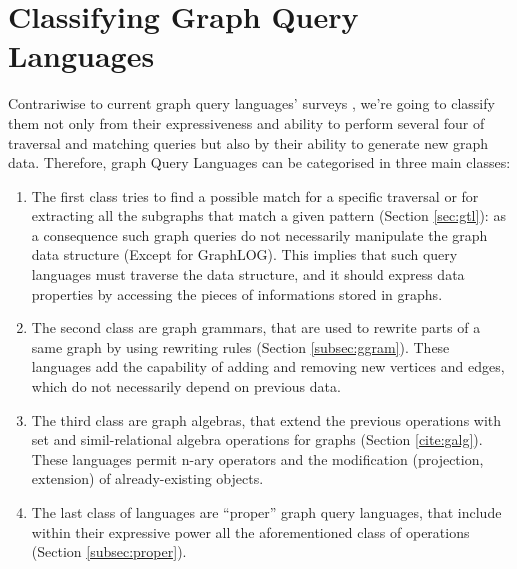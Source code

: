 \section{Classifying Graph Query Languages}\label{sec:dbqlang}

%

Contrariwise to current graph query languages' surveys \cite{AnglesABHRV17}, we're going to classify them not only from their expressiveness and ability to perform several four of traversal and matching queries but also by their ability to generate new graph data. Therefore, graph Query Languages can be categorised in three main classes:
\begin{enumerate}
	\item The first class  tries to find a
	possible match for a specific traversal  or for extracting all the subgraphs that match a given pattern (Section \vref{sec:gtl}): as a consequence such graph
	queries do not necessarily manipulate the graph data structure (Except for GraphLOG). This implies that such query languages must traverse the data structure, and it should express data properties by accessing the pieces of informations stored in graphs.
	\item The second class are graph grammars, that are used to rewrite parts of a same graph by using rewriting rules (Section \vref{subsec:ggram}). These languages add the capability of adding and removing new vertices and edges, which do not necessarily depend on previous data.
	\item The third class are graph algebras, that extend the previous operations with set and simil-relational algebra operations for graphs (Section \vref{cite:galg}). These languages permit n-ary operators and the modification (projection, extension) of already-existing objects.
	\item The last class of languages are ``proper'' graph query languages, that include within their expressive power all the aforementioned class of operations (Section \vref{subsec:proper}).
\end{enumerate}

